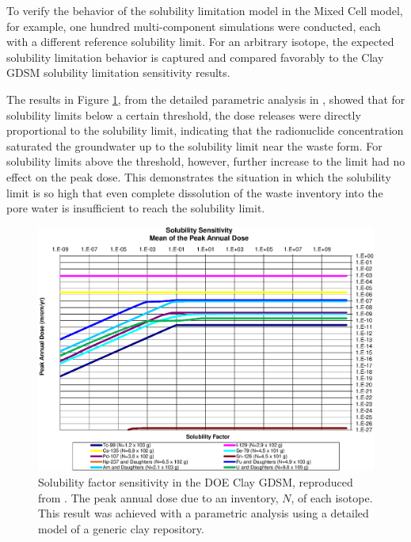 To verify the behavior of the solubility limitation model in the Mixed Cell
model, for example, one hundred multi-component simulations were conducted,
each with a different reference solubility limit.
For an arbitrary isotope, the expected solubility
limitation behavior is captured and compared favorably to the Clay \gls{GDSM}
solubility limitation sensitivity results.

The results in Figure \ref{fig:SolSumFactor}, from the detailed parametric
analysis in \cite{huff_key_2012}, showed that for solubility limits below a
certain threshold, the dose releases were directly proportional to the
solubility limit, indicating that the radionuclide concentration saturated the
groundwater up to the solubility limit near the waste form.  For solubility
limits above the threshold, however, further increase to the limit had no
effect on the peak dose. This demonstrates the situation in which the
solubility limit is so high that even complete dissolution of the waste
inventory into the pore water is insufficient to reach the solubility limit.


\begin{figure}[ht]
\begin{center}
\includegraphics[width=0.7\linewidth]{./results/images/Solubility_Summary_SolFactor.eps}
\caption[Solubility factor sensitivity in the Clay GDSM model]{Solubility
        factor sensitivity in the DOE Clay GDSM, reproduced from 
        \cite{huff_key_2012}. The peak annual dose due to an inventory, $N$, of each
isotope. This result was achieved with a parametric analysis using a detailed
        model of a generic clay repository.}
\label{fig:SolSumFactor}
\end{center}
\end{figure}

